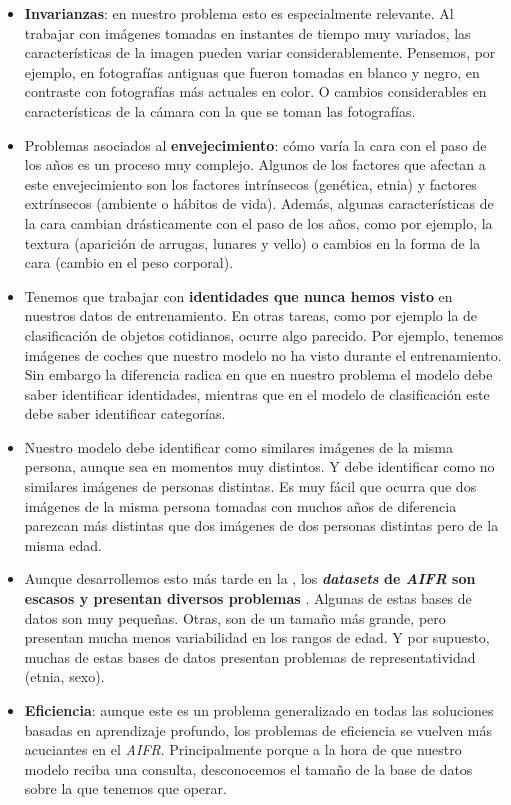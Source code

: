 \begin{itemize}
	\item \textbf{Invarianzas}: en nuestro problema esto es especialmente relevante. Al trabajar con imágenes tomadas en instantes de tiempo muy variados, las características de la imagen pueden variar considerablemente. Pensemos, por ejemplo, en fotografías antiguas que fueron tomadas en blanco y negro, en contraste con fotografías más actuales en color. O cambios considerables en características de la cámara con la que se toman las fotografías.

	\item Problemas asociados al \textbf{envejecimiento}: cómo varía la cara con el paso de los años es un proceso muy complejo. Algunos de los factores que afectan a este envejecimiento \cite{informatica:tecnica_sintesis_aifr} son los factores intrínsecos (genética, etnia) y factores extrínsecos (ambiente o hábitos de vida). Además, algunas características de la cara cambian drásticamente con el paso de los años, como por ejemplo, la textura (aparición de arrugas, lunares y vello) o cambios en la forma de la cara (cambio en el peso corporal).

	\item Tenemos que trabajar con \textbf{identidades que nunca hemos visto} en nuestros datos de entrenamiento. En otras tareas, como por ejemplo la de clasificación de objetos cotidianos, ocurre algo parecido. Por ejemplo, tenemos imágenes de coches que nuestro modelo no ha visto durante el entrenamiento. Sin embargo la diferencia radica en que en nuestro problema el modelo debe saber identificar identidades, mientras que en el modelo de clasificación este debe saber identificar categorías.

	\item Nuestro modelo debe identificar como similares imágenes de la misma persona, aunque sea en momentos muy distintos. Y debe identificar como no similares imágenes de personas distintas. Es muy fácil que ocurra que dos imágenes de la misma persona tomadas con muchos años de diferencia parezcan más distintas que dos imágenes de dos personas distintas pero de la misma edad.

	\item Aunque desarrollemos esto más tarde en la , los \textbf{\textit{datasets} de \textit{AIFR} son escasos y presentan diversos problemas} \cite{informatica:tecnica_sintesis_aifr}. Algunas de estas bases de datos son muy pequeñas. Otras, son de un tamaño más grande, pero presentan mucha menos variabilidad en los rangos de edad. Y por supuesto, muchas de estas bases de datos presentan problemas de representatividad (etnia, sexo).

	\item \textbf{Eficiencia}: aunque este es un problema generalizado en todas las soluciones basadas en aprendizaje profundo, los problemas de eficiencia se vuelven más acuciantes en el \textit{AIFR}. Principalmente porque a la hora de que nuestro modelo reciba una consulta, desconocemos el tamaño de la base de datos sobre la que tenemos que operar.
\end{itemize}

